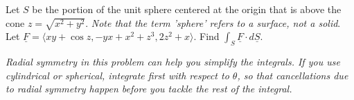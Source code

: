 \documentclass[12pt,letterpaper,noanswers]{exam}
\newcommand{\mb}[1]{\underline{#1}}
\begin{document}
\begin{questions}
\question 
Let $S$ be the portion of the unit sphere centered at the origin that is above the cone $z = \sqrt{x^2+y^2}$.  \emph{Note that the term 'sphere' refers to a surface, not a solid}.  Let $\displaystyle\underline F = \langle xy+\cos z, -yx+x^2+z^3,2z^2+x\rangle$.  Find $\displaystyle\int_S\underline F\cdot d\underline S$.

\emph{Radial symmetry in this problem can help you simplify the integrals.  If you use cylindrical or spherical, integrate first with respect to $\theta$, so that cancellations due to radial symmetry happen before you tackle the rest of the integral.}






\end{questions}
\end{document}
